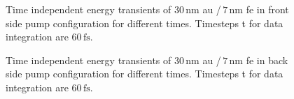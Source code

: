 \documentclass[a4paper,12pt,twoside]{article}
\begin{document}
		\begin{figure}[H]
		\caption{Time independent energy transients of $30\,\mathrm{\mbox{nm}}$ \gls{au} /\,$7\,\mathrm{\mbox{nm}}$ \gls{fe} in front side pump configuration for different times. Timesteps \textDelta t for data integration are $60\,\mathrm{fs}$.}
    		\label{transients7}
	\end{figure}
		\begin{figure}[H]
		\caption{Time independent energy transients of $30\,\mathrm{\mbox{nm}}$ \gls{au} /\,$7\,\mathrm{\mbox{nm}}$ \gls{fe} in back side pump configuration for different times. Timesteps \textDelta t for data integration are $60\,\mathrm{fs}$.}
    		\label{transients8}
	\end{figure}
\end{document}
